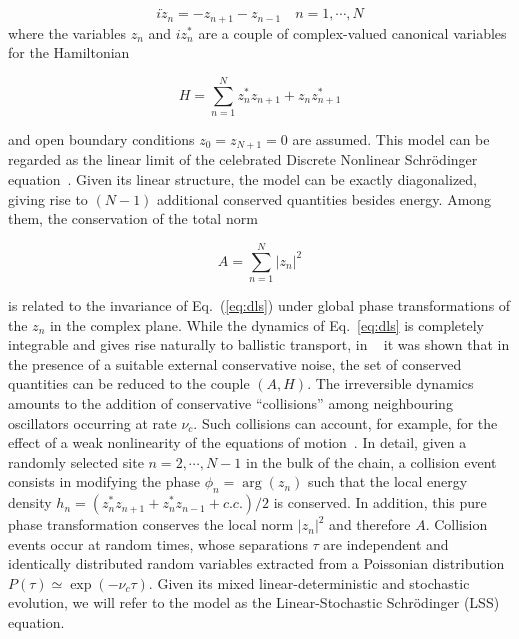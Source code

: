 \documentclass[iop, twocolumns, amssymb,notitlepage]{revtex4-1}
\newcommand{\indice}{n}
\begin{document}
\begin{equation}
\label{eq:dls}
i\dot z_\indice = -z_{\indice+1} - z_{\indice-1} \quad \indice=1,\cdots,N
\end{equation}
where the variables $z_n$ and $i z_\indice^*$ are a couple of complex-valued canonical variables for the Hamiltonian

\begin{equation}
H=\sum_{\indice=1}^N   z_{\indice}^* z_{\indice+1} + z_\indice z_{\indice+1}^*
\end{equation}

and open boundary conditions $z_0=z_{N+1}=0$ are assumed. This model can be regarded as the
linear limit of the celebrated Discrete Nonlinear Schr\"odinger equation~\cite{kevrekidis09}.
Given its linear structure, the model can be exactly diagonalized, giving rise to $(N-1)$ additional conserved quantities
besides energy. Among them, the conservation of the total norm

\begin{equation}
A = \sum_{n=1}^N |z_n|^2
\end{equation}

is related to the invariance of Eq.~(\ref{eq:dls}) under global phase transformations of the $z_\indice$ in the complex plane.
While the dynamics of Eq.~\ref{eq:dls} is completely integrable and gives rise naturally to ballistic transport, 
in ~\cite{iubini19} it was shown that in the presence of a suitable external conservative noise, the set of conserved
quantities can be reduced to the couple $(A,H)$. The irreversible dynamics amounts to the addition of conservative
``collisions'' among neighbouring oscillators occurring at rate $\nu_c$.
 Such collisions can account, for example, for the effect of a weak nonlinearity of the equations of motion~\cite{onorato20}.
 In detail, given a randomly selected site 
$\indice=2,\cdots,N-1$ in the bulk of the chain, a collision event consists in modifying the phase $\phi_\indice=\arg(z_n)$ such that 
the local energy density $h_n =\left(z_{\indice}^* z_{\indice+1} + z_\indice^* z_{\indice-1} +c.c.\right)/2 $ is conserved. In addition, this pure
phase transformation conserves the local norm $|z_n|^2$ and therefore $A$.
Collision events occur at random times, whose separations $\tau$ are independent and identically distributed random variables
extracted from a Poissonian distribution $P(\tau)\simeq \exp(-\nu_c \tau)$. Given its  mixed linear-deterministic and stochastic
evolution, we will refer to the model as the Linear-Stochastic Schr\"odinger (LSS) equation.  
 
\end{document}
